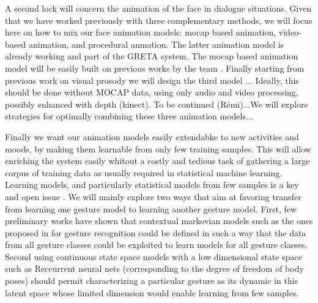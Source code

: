 
A second lock will concern the animation of the face in dialogue situations. Given that we have worked previously with three complementary methods, we will focus here on how to mix our face animation models: mocap based animation, video-based animation, and procedural anmation. 
The latter animation model is already working and part of the GRETA system. The mocap based animation model will be easily built on previous works by the team \cite{YuThesis}. 
Finally starting from previous work on visual prosody we will design the third model ... Ideally, this should be done without MOCAP data, using only audio and video processing, possibly enhanced with depth (kinect). To be continued (Rémi)...We will explore strategies for optimally combining these three animation models...

Finally we want our animation models easily extendabke to new activities and moods, by making them learnable from only few training samples. 
This  will allow enriching the system easily whitout a costly and tedious task of gathering a large corpus of training data as usually required in statistical machine learning. Learning models, and particularly statistical models from few samples is a key and open issue \cite{NIPS2013_OneShot}. We will mainly explore two ways that aim at favoring transfer from learning one
gesture model to learning another gesture model. 
First, few preliminary works have shown that contextual markovian models such as the ones proposed in \cite{Radenen2014} for gesture recognition could be defined in such a way that the data from all gesture classes could be exploited to learn models for all gesture classes. 
Second using continuous state space models with a low dimensional state space such as Reccurrent neural nets 
(corresponding to the degree of freedom of body poses) should permit characterizing a particular gesture as its dynamic
in this latent space whose limited dimension would enable learning from few samples. 


